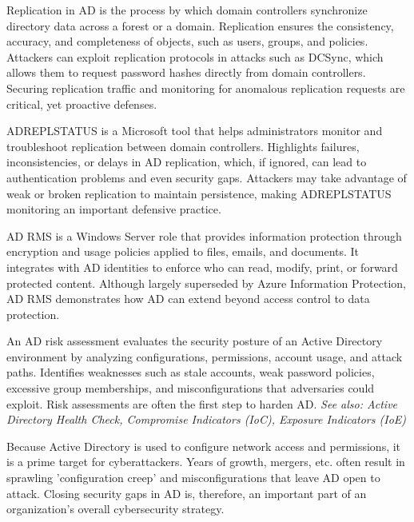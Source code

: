   Replication in AD is the process by which domain controllers synchronize directory data across a forest or a domain. Replication ensures the consistency, accuracy, and completeness of objects, such as users, groups, and policies. Attackers can exploit replication protocols in attacks such as DCSync, which allows them to request password hashes directly from domain controllers. Securing replication traffic and monitoring for anomalous replication requests are critical, yet proactive defenses.

  ADREPLSTATUS is a Microsoft tool that helps administrators monitor and troubleshoot replication between domain controllers. Highlights failures, inconsistencies, or delays in AD replication, which, if ignored, can lead to authentication problems and even security gaps. Attackers may take advantage of weak or broken replication to maintain persistence, making ADREPLSTATUS monitoring an important defensive practice.

 AD RMS is a Windows Server role that provides information protection through encryption and usage policies applied to files, emails, and documents. It integrates with AD identities to enforce who can read, modify, print, or forward protected content. Although largely superseded by Azure Information Protection, AD RMS demonstrates how AD can extend beyond access control to data protection.

 An AD risk assessment evaluates the security posture of an Active Directory environment by analyzing configurations, permissions, account usage, and attack paths. Identifies weaknesses such as stale accounts, weak password policies, excessive group memberships, and misconfigurations that adversaries could exploit. Risk assessments are often the first step to harden AD.
\textit{See also: Active Directory Health Check, Compromise Indicators (IoC), Exposure Indicators (IoE)}

 Because Active Directory is used to configure network access and permissions, it is a prime target for cyberattackers. Years of growth, mergers, etc. often result in sprawling 'configuration creep' and misconfigurations that leave AD open to attack. Closing security gaps in AD is, therefore, an important part of an organization’s overall cybersecurity strategy. 

